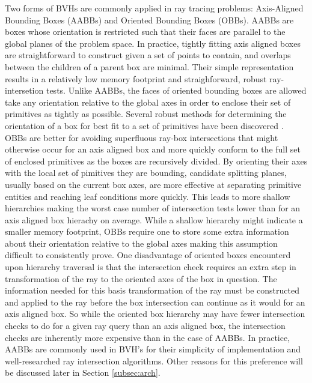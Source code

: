 \documentclass[12pt, a4paper]{article}
\begin{document}
Two forms of BVHs are commonly applied in ray tracing problems: Axis-Aligned Bounding Boxes (AABBs) and Oriented Bounding Boxes (OBBs). AABBs are boxes whose orientation is restricted such that their faces are parallel to the global planes of the problem space. In practice, tightly fitting axis aligned boxes are straightforward to construct given a set of points to contain, and overlaps between the children of a parent box are minimal. Their simple representation results in a relatively low memory footprint and straighforward, robust ray-intersetion tests. Unlike AABBs, the faces of oriented bounding boxes are allowed take any orientation relative to the global axes in order to enclose their set of primitives as tightly as possible. Several robust methods for determining the orientation of a box for best fit to a set of primitives have been discovered \cite{Gottschalk_1996,ORourke_1985}. OBBs are better for avoiding superfluous ray-box intersections that might otherwise occur for an axis aligned box and more quickly conform to the full set of enclosed primitives as the boxes are recursively divided. By orienting their axes with the local set of pimitives they are bounding, candidate splitting planes, usually based on the current box axes, are more effective at separating primitive entities and reaching leaf conditions more quickly. This leads to more shallow hierarchies making the worst case number of intersection tests lower than for an axis aligned box hierachy on average. While a shallow hierarchy might indicate a smaller memory footprint, OBBs require one to store some extra information about their orientation relative to the global axes making this assumption difficult to consistently prove. One disadvantage of oriented boxes encounterd upon hierarchy traversal is that the intersection check requires an extra step in transformation of the ray to the oriented axes of the box in question. The information needed for this basis transformation of the ray must be constructed and applied to the ray before the box intersection can continue as it would for an axis aligned box. So while the oriented box hierarchy may have fewer intersection checks to do for a given ray query than an axis aligned box, the intersection checks are inherently more expensive than in the case of AABBs. In practice, AABBs are commonly used in BVH's for their simplicity of implementation and well-researched ray intersection algorithms. Other reasons for this preference will be discussed later in Section \ref{subsec:arch}.
\end{document}
